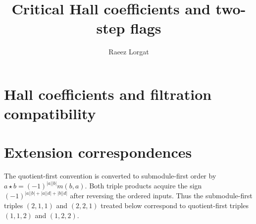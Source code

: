 \documentclass[11pt,oneside]{memoir}
\title{Critical Hall coefficients and two-step flags}
\author{Raeez Lorgat}
\date{}
\begin{document}
\maketitle
\chapter{Hall coefficients and filtration compatibility}

\chapter{Extension correspondences}
\label{ch:extension-correspondences}
The quotient-first convention is converted to submodule-first order by
$a\star b=(-1)^{|a||b|}m(b,a)$. Both triple products acquire the sign
$(-1)^{|a||b|+|a||d|+|b||d|}$ after reversing the ordered inputs.
Thus the submodule-first triples $(2,1,1)$ and $(2,2,1)$ treated below
correspond to quotient-first triples $(1,1,2)$ and $(1,2,2)$.


\end{document}
